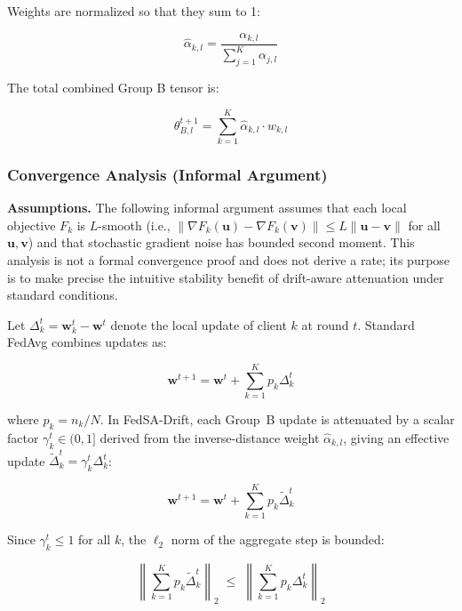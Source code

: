 \documentclass[utf8]{FrontiersinHarvard} %
\newcommand{\sadrift}{FedSA-Drift}
\begin{document}
Weights are normalized so that they sum to 1:

\begin{equation}
\label{eq:norm_weight}
\hat{\alpha}_{k,l} = \frac{\alpha_{k,l}}{\sum_{j=1}^{K} \alpha_{j,l}}
\end{equation}

The total combined Group B tensor is:

\begin{equation}
\label{eq:groupB_agg}
\theta_{B,l}^{t+1} = \sum_{k=1}^{K} \hat{\alpha}_{k,l} \cdot w_{k,l}
\end{equation}

\subsubsection{Convergence Analysis (Informal Argument)}

\noindent\textbf{Assumptions.}
The following informal argument assumes that each local objective $F_k$ is $L$-smooth (i.e., $\|\nabla F_k(\mathbf{u}) - \nabla F_k(\mathbf{v})\| \le L\|\mathbf{u}-\mathbf{v}\|$ for all $\mathbf{u},\mathbf{v}$) and that stochastic gradient noise has bounded second moment. This analysis is not a formal convergence proof and does not derive a rate; its purpose is to make precise the intuitive stability benefit of drift-aware attenuation under standard conditions.

Let $\Delta_k^t = \mathbf{w}_k^t - \mathbf{w}^t$ denote the local update of client $k$ at round $t$. Standard FedAvg combines updates as:

\begin{equation}
\label{eq:fedavg_agg}
\mathbf{w}^{t+1} = \mathbf{w}^t + \sum_{k=1}^{K} p_k \Delta_k^t
\end{equation}

where $p_k = n_k / N$. In \sadrift{}, each Group~B update is attenuated by a scalar factor $\gamma_k^t \in (0,1]$ derived from the inverse-distance weight $\hat{\alpha}_{k,l}$, giving an effective update $\tilde{\Delta}_k^t = \gamma_k^t \Delta_k^t$:

\begin{equation}
\label{eq:sadrift_agg}
\mathbf{w}^{t+1} = \mathbf{w}^t + \sum_{k=1}^{K} p_k \tilde{\Delta}_k^t
\end{equation}

Since $\gamma_k^t \le 1$ for all $k$, the $\ell_2$ norm of the aggregate step is bounded:

\begin{equation}
\label{eq:stability_bound}
\left\|\sum_{k=1}^K p_k \tilde{\Delta}_k^t\right\|_2
\;\le\;
\left\|\sum_{k=1}^K p_k \Delta_k^t\right\|_2
\end{equation}
\end{document}
